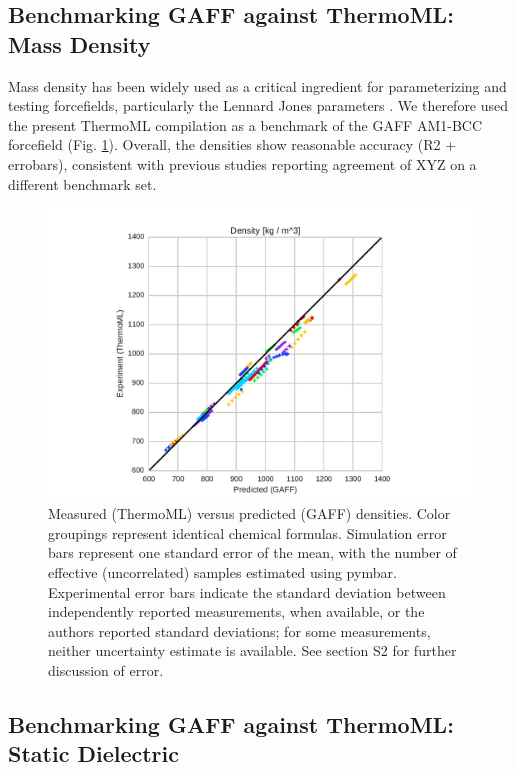 \documentclass[journal=jacsat,manuscript=article]{achemso}
\begin{document}
\subsection{Benchmarking GAFF against ThermoML: Mass Density}

Mass density has been widely used as a critical ingredient for parameterizing and testing forcefields, particularly the Lennard Jones parameters \cite{jorgensen1983comparison, jorgensen1984optimized}.  We therefore used the present ThermoML compilation as a benchmark of the GAFF AM1-BCC forcefield (Fig. \ref{figure:Density}).  Overall, the densities show reasonable accuracy (R2 + errobars), consistent with previous studies \cite{caleman2011force} reporting agreement of XYZ on a different benchmark set.  

\begin{figure}
\includegraphics[width=\columnwidth]{./figures/densities_thermoml.pdf}
\caption{Measured (ThermoML) versus predicted (GAFF) densities.  Color groupings represent identical chemical formulas.  Simulation error bars represent one standard error of the mean, with the number of effective (uncorrelated) samples estimated using pymbar.  Experimental error bars indicate the standard deviation between independently reported measurements, when available, or the authors reported standard deviations; for some measurements, neither uncertainty estimate is available.  See section S2 for further discussion of error.
}
\label{figure:Density}
\end{figure}


\subsection{Benchmarking GAFF against ThermoML: Static Dielectric}
\end{document}
